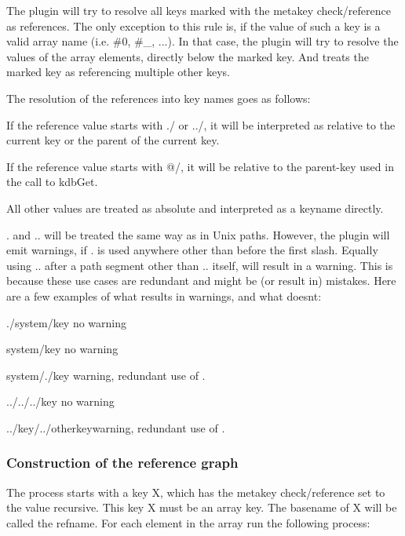 The plugin will try to resolve all keys marked with the metakey {\ttfamily check/reference} as references. The only exception to this rule is, if the value of such a key is a valid array name (i.\+e. {\ttfamily \#0}, {\ttfamily \#\+\_}, ...). In that case, the plugin will try to resolve the values of the array elements, directly below the marked key. And treats the marked key as referencing multiple other keys.

The resolution of the references into key names goes as follows\+:


\begin{DoxyItemize}
\item If the reference value starts with {\ttfamily ./} or {\ttfamily ../}, it will be interpreted as relative to the current key or the parent of the current key.
\item If the reference value starts with {\ttfamily @/}, it will be relative to the parent-\/key used in the call to {\ttfamily kdb\+Get}.
\item All other values are treated as absolute and interpreted as a keyname directly.
\item {\ttfamily .} and {\ttfamily ..} will be treated the same way as in Unix paths. However, the plugin will emit warnings, if {\ttfamily .} is used anywhere other than before the first slash. Equally using {\ttfamily ..} after a path segment other than {\ttfamily ..} itself, will result in a warning. This is because these use cases are redundant and might be (or result in) mistakes. Here are a few examples of what results in warnings, and what doesn\textquotesingle{}t\+:
\begin{DoxyItemize}
\item {\ttfamily ./system/key} no warning
\item {\ttfamily system/key} no warning
\item {\ttfamily system/./key} warning, redundant use of {\ttfamily .}
\item {\ttfamily ../../../key} no warning
\item {\ttfamily ../key/../otherkey}warning, redundant use of {\ttfamily .}
\end{DoxyItemize}
\end{DoxyItemize}

\subsubsection*{Construction of the reference graph}

The process starts with a key {\ttfamily X}, which has the metakey {\ttfamily check/reference} set to the value {\ttfamily recursive}. This key {\ttfamily X} must be an array key. The basename of {\ttfamily X} will be called the {\ttfamily refname}. For each element in the array run the following process\+:


